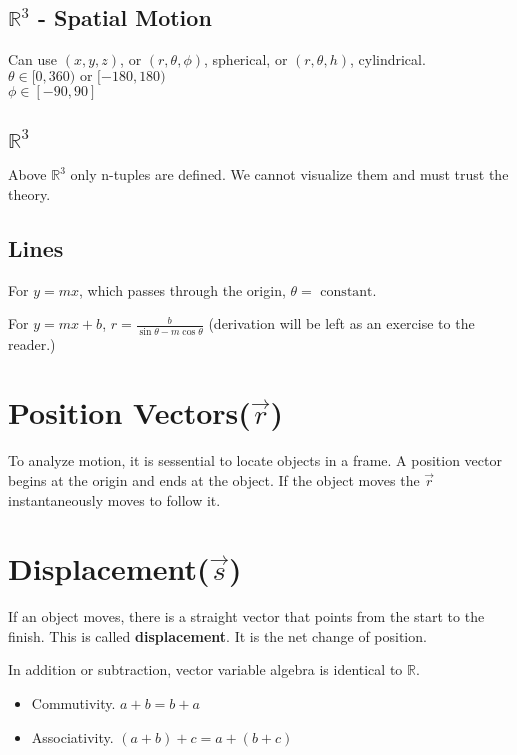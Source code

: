 \documentclass[letterpaper]{article}
\begin{document}
\subsection{$\mathbb{R}^3$ - Spatial Motion}
Can use $(x, y, z)$, or $(r, \theta, \phi)$, spherical, or $(r, \theta, h)$, cylindrical.\\
$\theta \in [0, 360) \textrm{ or } [-180, 180)$\\
$\phi \in [-90, 90]$\\

\subsection{$\mathbb{R}^3$}
Above $\mathbb{R}^3$ only n-tuples are defined. We cannot visualize them and
must trust the theory. 

\subsection{Lines}

For $y = mx$, which passes through the origin, $\theta =\textrm{ constant}$.

For $y = mx + b$, $r = \frac{b}{\sin{\theta} - m\cos{\theta}}$ (derivation will
be left as an exercise to the reader.)

\section{Position Vectors($\vec{r}$)}
To analyze motion, it is sessential to locate objects in a frame. A position
vector begins at the origin and ends at the object. If the object moves
 the $\vec{r}$ instantaneously moves to follow it.

\section{Displacement($\vec{s}$)}
If an object moves, there is a straight vector that points from the start to the
finish. This is called {\bf displacement}. It is the net change of position.

In addition or subtraction, vector variable algebra is identical to $\mathbb{R}$.

\begin{itemize}
    \item Commutivity. $a + b = b + a$
    \item Associativity. $(a + b) + c = a + (b + c)$
\end{itemize}
\end{document}
